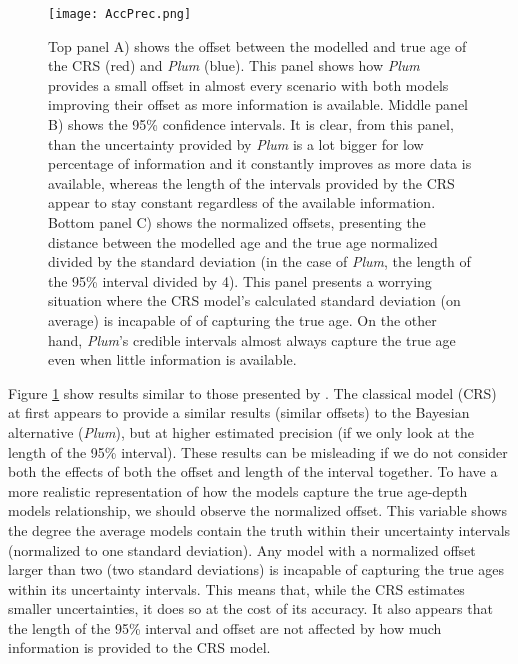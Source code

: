 \documentclass [10pt] {article}
\begin{document}
\begin{figure}[!]
 \centering
  \texttt{[image: AccPrec.png]}
	\caption{Top panel A) shows the offset between the modelled and true age of the CRS (red) and \textit{Plum} (blue). This panel shows how \textit{Plum} provides a small offset in almost every scenario with both models improving their offset as more information is available. Middle panel B) shows the 95\% confidence intervals. It is clear, from this panel, than the uncertainty provided by \textit{Plum} is a lot bigger for low percentage of information and it constantly improves as more data is available, whereas the length of the intervals provided by the CRS appear to stay constant regardless of the available information. Bottom panel C) shows the normalized offsets, presenting the distance between the modelled age and the true age normalized divided by the standard deviation (in the case of \textit{Plum}, the length of the 95\% interval divided by 4). This panel presents a worrying situation where the CRS model's calculated standard deviation (on average) is incapable of of capturing the true age. On the other hand, \textit{Plum}'s credible intervals almost always capture the true age even when little information is available.}
  \label{fig:accpre}
\end{figure}


Figure \ref{fig:accpre} show results similar to those presented by \citet{Blaauw2018}. 
The classical model (CRS) at first appears to provide a similar results (similar offsets) to the Bayesian alternative (\textit{Plum}), but at higher estimated precision (if we only look at the length of the 95\% interval). 
These results can be misleading if we do not consider both the effects of both the offset and length of the interval together. 
To have a more realistic representation of how the models capture the true age-depth models relationship, we should observe the normalized offset. 
This variable shows the degree the average models contain the truth within their uncertainty intervals (normalized to one standard deviation). 
Any model with a normalized offset larger than two (two standard deviations) is incapable of capturing the true ages within its uncertainty intervals.  
This means that, while the CRS estimates smaller uncertainties, it does so at the cost of its accuracy.
It also appears that the length of the 95\% interval and offset are not affected by how much information is provided to the CRS model. 
\end{document}
